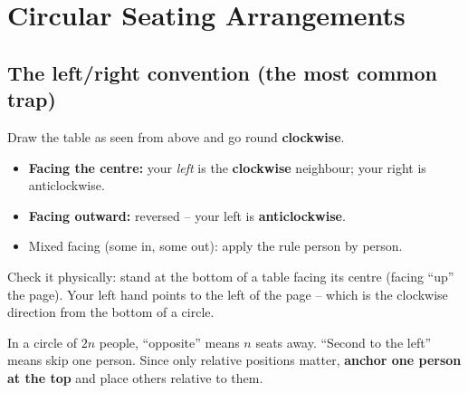 \documentclass[11pt,a4paper,openany]{report}
\begin{document}
\chapter{Circular Seating Arrangements}\label{ch:circseat}

\section{The left/right convention (the most common trap)}
\begin{idea}
Draw the table as seen from above and go round \textbf{clockwise}.
\begin{itemize}[nosep]
\item \textbf{Facing the centre:} your \emph{left} is the \textbf{clockwise} neighbour; your right is anticlockwise.
\item \textbf{Facing outward:} reversed -- your left is \textbf{anticlockwise}.
\item Mixed facing (some in, some out): apply the rule person by person.
\end{itemize}
Check it physically: stand at the bottom of a table facing its centre (facing ``up'' the page). Your left hand points to the left of the page -- which is the clockwise direction from the bottom of a circle.
\end{idea}

In a circle of $2n$ people, ``opposite'' means $n$ seats away. ``Second to the left'' means skip one person.
Since only relative positions matter, \textbf{anchor one person at the top} and place others relative to them.
\end{document}
